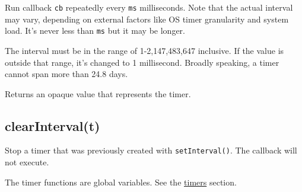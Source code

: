 Run callback \texttt{cb} repeatedly every \texttt{ms} milliseconds. Note
that the actual interval may vary, depending on external factors like OS
timer granularity and system load. It's never less than \texttt{ms} but
it may be longer.

The interval must be in the range of 1-2,147,483,647 inclusive. If the
value is outside that range, it's changed to 1 millisecond. Broadly
speaking, a timer cannot span more than 24.8 days.

Returns an opaque value that represents the timer.

\subsection{clearInterval(t)}

Stop a timer that was previously created with \texttt{setInterval()}.
The callback will not execute.

The timer functions are global variables. See the
\href{timers.html}{timers} section.
